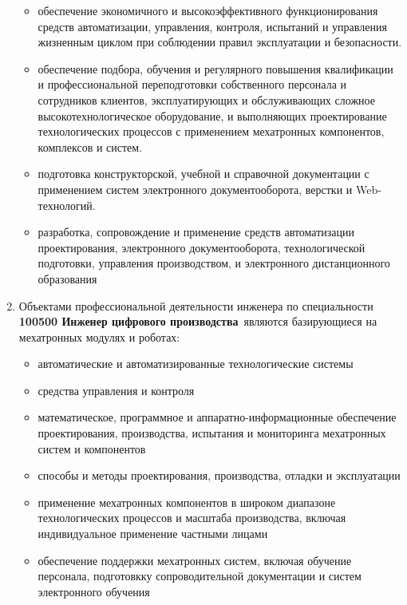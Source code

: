\begin{enumerate}
\begin{itemize}[nosep]
    \item обеспечение экономичного и высокоэффективного функционирования средств
    автоматизации, управления, контроля, испытаний и управления жизненным циклом
    при соблюдении правил эксплуатации и безопасности.
    
    \item обеспечение подбора, обучения и регулярного повышения квалификации и
    профессиональной переподготовки собственного персонала и сотрудников
    клиентов, эксплуатирующих и обслуживающих сложное высокотехнологическое
    оборудование, и выполняющих проектирование технологических процессов с
    применением мехатронных компонентов, комплексов и систем.
    
    \item подготовка конструкторской, учебной и справочной документации с
    применением систем электронного документооборота, верстки и Web-технологий.
    
    \item разработка, сопровождение и применение средств автоматизации
    проектирования, электронного документооборота, технологической подготовки,
    управления производством, и электронного дистанционного образования
     
  \end{itemize}
  
  \item Объектами профессиональной деятельности инженера по специальности
  \textbf{100500 Инженер цифрового производства}\ являются базирующиеся на
  мехатронных модулях и роботах:
  \begin{itemize}[nosep]
    \item автоматические и автоматизированные технологические системы
    \item средства управления и контроля
    \item математическое, программное и аппаратно-информационные обеспечение
    проектирования, производства, испытания и мониторинга мехатронных систем и
    компонентов
    \item способы и методы проектирования, производства, отладки и эксплуатации
    \item применение мехатронных компонентов в широком диапазоне технологических
    процессов и масштаба производства, включая индивидуальное применение
    частными лицами
    \item обеспечение поддержки мехатронных систем, включая обучение персонала,
    подготовкку сопроводительной документации и систем электронного обучения
  \end{itemize}
  

\end{enumerate}
